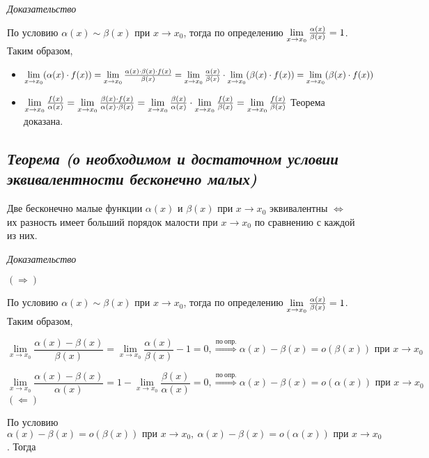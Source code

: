 \textit{Доказательство}

По условию $\alpha(x)\sim\beta(x)$ при $x \rightarrow x_0$, тогда по определению $\lim\limits_{x \to x_0}{\Large\frac{\alpha(x)}{\beta(x)}} = 1$. Таким образом,
\begin{itemize}

\item $\lim\limits_{x \to x_0}(\alpha(x)\cdot f(x)) = \lim\limits_{x \to x_0}{\Large\frac{\alpha(x)\cdot\beta(x)\cdot f(x)}{\beta(x)}} = \lim\limits_{x \to x_0}{\Large\frac{\alpha(x)}{\beta(x)}}\cdot\lim\limits_{x \to x_0}(\beta(x)\cdot f(x)) = \lim\limits_{x \to x_0}(\beta(x)\cdot f(x))$
\item $\lim\limits_{x \to x_0}{\Large\frac{f(x)}{\alpha(x)}} = \lim\limits_{x \to x_0}{\Large\frac{\beta(x)\cdot f(x)}{\alpha(x)\cdot\beta(x)}} = \lim\limits_{x \to x_0}{\Large\frac{\beta(x)}{\alpha(x)}}\cdot\lim\limits_{x \to x_0}{\Large\frac{f(x)}{\beta(x)}} = \lim\limits_{x \to x_0}{\Large\frac{f(x)}{\beta(x)}}$ Теорема доказана.

\end{itemize}
\subsection{\textit{Теорема (о необходимом и достаточном условии эквивалентности бесконечно малых)}}

Две бесконечно малые функции $\alpha(x)$ и $\beta(x)$ при $x \rightarrow x_0$ эквивалентны $\iff$ их разность имеет больший порядок малости при $x \rightarrow x_0$ по сравнению с каждой из них.

\textit{Доказательство}

$(\Rightarrow)$

По условию $\alpha(x) \sim \beta(x)$ при $x \rightarrow x_0$, тогда по определению $\lim\limits_{x \to x_0}{\Large\frac{\alpha(x)}{\beta(x)}} = 1$. Таким образом,

$$\lim\limits_{x \to x_0}{\frac{\alpha(x) - \beta(x)}{\beta(x)}} = \lim\limits_{x \to x_0}{\frac{\alpha(x)}{\beta(x)}} - 1 = 0, \overset{по \ опр.}\Rightarrow \alpha(x) - \beta(x) = o (\beta(x)) \text{ при } x \rightarrow x_0$$

$$\lim\limits_{x \to x_0}{\frac{\alpha(x) - \beta(x)}{\alpha(x)}} = 1 - \lim\limits_{x \to x_0}{\frac{\beta(x)}{\alpha(x)}} = 0, \overset{по \ опр.}\Rightarrow \alpha(x) - \beta(x) = o (\alpha(x)) \text{ при } x \rightarrow x_0$$ $(\Leftarrow)$

По условию $\alpha(x) - \beta(x) = o (\beta(x)) \text{ при } x \rightarrow x_0, \ \alpha(x) - \beta(x) = o (\alpha(x)) \text{ при } x \rightarrow x_0$. Тогда

